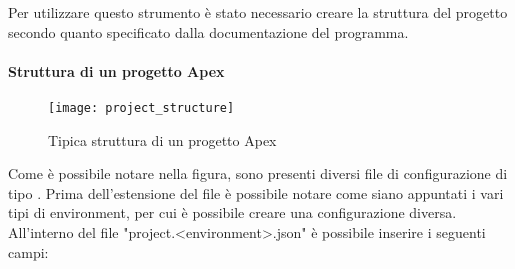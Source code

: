 Per utilizzare questo strumento è stato necessario creare la struttura del
progetto secondo quanto specificato dalla documentazione del programma.

\paragraph*{Struttura di un progetto Apex}

\begin{figure}[H]
  \centering
  \texttt{[image: project\_structure]}
  \caption{Tipica struttura di un progetto Apex}
\end{figure}

Come è possibile notare nella figura, sono presenti diversi file di
configurazione di tipo . Prima
dell'estensione del file è possibile notare come siano appuntati i vari tipi di
environment, per cui è possibile creare una configurazione diversa.
All'interno del file "project.<environment>.json" è possibile inserire i
seguenti campi:
